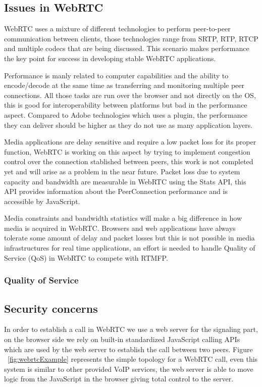 \subsection{Issues in WebRTC}

WebRTC uses a mixture of different technologies to perform peer-to-peer communication between clients, those technologies range from SRTP, RTP, RTCP and multiple codecs that are being discussed. This scenario makes performance the key point for success in developing stable WebRTC applications. 

Performance is manly related to computer capabilities and the ability to encode/decode at the same time as transferring and monitoring multiple peer connections. All those tasks are run over the browser and not directly on the OS, this is good for interoperability between platforms but bad in the performance aspect. Compared to Adobe technologies which uses a plugin, the performance they can deliver should be higher as they do not use as many application layers.

Media applications are delay sensitive and require a low packet loss for its proper function, WebRTC is working on this aspect by trying to implement congestion control over the connection stablished between peers, this work is not completed yet and will arise as a problem in the near future. Packet loss due to system capacity and bandwidth are measurable in WebRTC using the Stats API, this API provides information about the PeerConnection performance and is accessible by JavaScript.

Media constraints and bandwidth statistics will make a big difference in how media is acquired in WebRTC. Browsers and web applications have always tolerate some amount of delay and packet losses but this is not possible in media infrastructures for real time applications, an effort is needed to handle Quality of Service (QoS) in WebRTC to compete with RTMFP.

\subsubsection{Quality of Service}



\subsection{Security concerns}

In order to establish a call in WebRTC we use a web server for the signaling part, on the browser side we rely on built-in standardized JavaScript calling APIs which are used by the web server to establish the call between two peers. Figure ~\ref{fig:webrtcExample} represents the simple topology for a WebRTC call, even this system is similar to other provided VoIP services, the web server is able to move logic from the JavaScript in the browser giving total control to the server.

